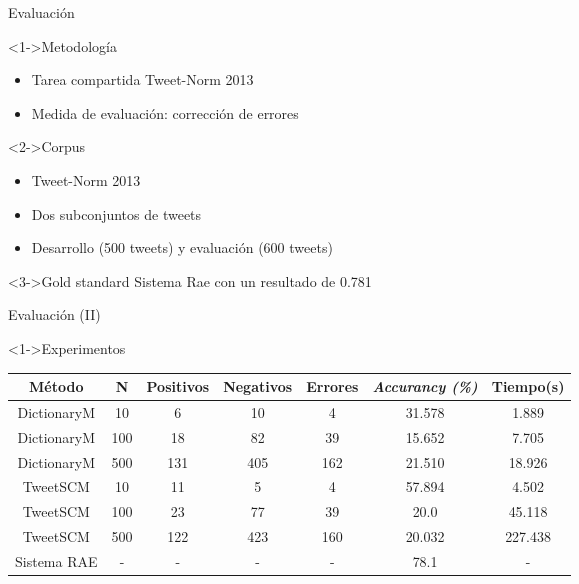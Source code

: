 \begin{tframe}{Evaluaci\'on}
	\begin{block}<1->{Metodolog\'ia}
		\begin{itemize}
			\item Tarea compartida Tweet-Norm 2013
			\item Medida de evaluaci\'on: correcci\'on de errores
		\end{itemize}
	\end{block}
	\begin{block}<2->{Corpus}
		\begin{itemize}
			\item Tweet-Norm 2013
			\item Dos subconjuntos de tweets
			\item Desarrollo (500 tweets) y evaluaci\'on (600 tweets)
		\end{itemize}
	\end{block}
	\begin{block}<3->{Gold standard}
		Sistema Rae con un resultado de 0.781
	\end{block}
\end{tframe}

\begin{tframe}{Evaluaci\'on (II)}
	\begin{block}<1->{Experimentos}
	\begin{adjustbox}{max width=\textwidth}
		\begin{tabular}{|c|c|c|c|c|c|c|}
\hline 
\textbf{M\'etodo} & \textbf{N} & \textbf{Positivos} & \textbf{Negativos} & \textbf{Errores} & \textbf{\textit{Accurancy (\%)}} & \textbf{Tiempo(s)} \\ 
\hline 
DictionaryM & 10 & 6 & 10 & 4 & 31.578 & 1.889 \\ 
\hline 
DictionaryM & 100 & 18 & 82 & 39 & 15.652 & 7.705 \\ 
\hline 
DictionaryM & 500 & 131 & 405 & 162 & 21.510 & 18.926 \\ 
\hline 
TweetSCM & 10 & 11 & 5 & 4 & 57.894 & 4.502 \\ 
\hline 
TweetSCM & 100 & 23 & 77 & 39 & 20.0 & 45.118 \\ 
\hline 
TweetSCM & 500 & 122 & 423 & 160 & 20.032 & 227.438 \\ 
\hline 
Sistema RAE & - & - & - & - & 78.1 & - \\ 
\hline 
\end{tabular}
\end{adjustbox}
	\end{block}
\end{tframe}

